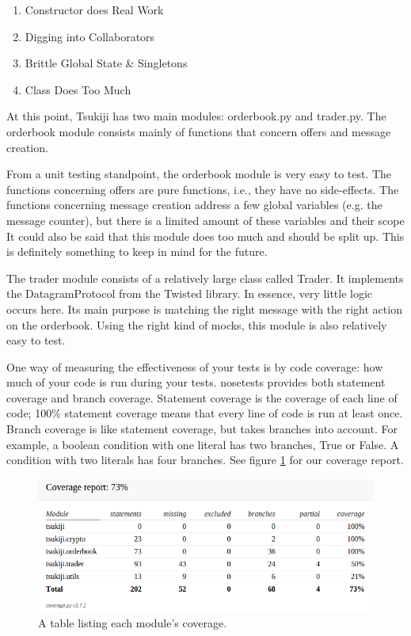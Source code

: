 \begin{enumerate}
\item Constructor does Real Work
\item Digging into Collaborators
\item Brittle Global State \& Singletons
\item Class Does Too Much
\end{enumerate}

At this point, Tsukiji has two main modules: orderbook.py and trader.py.
The orderbook module consists mainly of functions that concern offers and message creation.

From a unit testing standpoint, the orderbook module is very easy to test.
The functions concerning offers are pure functions, i.e., they have no side-effects.
The functions concerning message creation address a few global variables (e.g. the message counter), but there is a limited amount of these variables and their scope
It could also be said that this module does too much and should be split up.
This is definitely something to keep in mind for the future.

The trader module consists of a relatively large class called Trader.
It implements the DatagramProtocol from the Twisted library.
In essence, very little logic occurs here.
Its main purpose is matching the right message with the right action on the orderbook.
Using the right kind of mocks, this module is also relatively easy to test.

One way of measuring the effectiveness of your tests is by code coverage: how much of your code is run during your tests.
nosetests provides both statement coverage and branch coverage.
Statement coverage is the coverage of each line of code; 100\% statement coverage means that every line of code is run at least once.
Branch coverage is like statement coverage, but takes branches into account.
For example, a boolean condition with one literal has two branches, True or False.
A condition with two literals has four branches.
See figure \ref{coveragefig} for our coverage report.

\begin{figure}
  \centering
  \includegraphics[width=\textwidth]{coverage}
  \caption{A table listing each module's coverage.}
  \label{coveragefig}
\end{figure}


